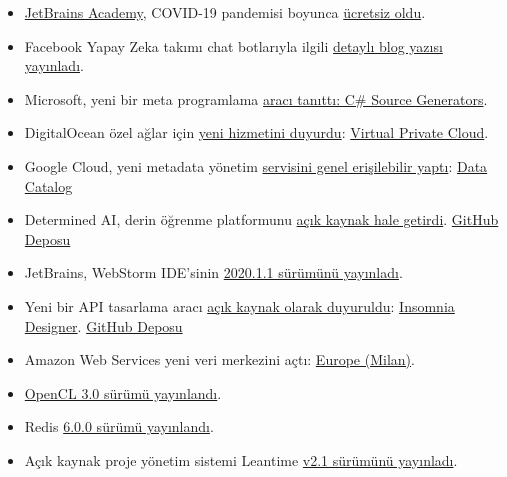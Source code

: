 \documentclass[11pt]{article}
\begin{document}
\begin{itemize}
\item \href{https://www.jetbrains.com/academy/}{JetBrains Academy}, COVID-19 pandemisi boyunca \href{https://techcrunch.com/2020/05/01/jetbrains-academy-for-learning-code-launches-for-free-during-covid-19-pandemic/}{ücretsiz oldu}.
\item Facebook Yapay Zeka takımı chat botlarıyla ilgili \href{https://ai.facebook.com/blog/state-of-the-art-open-source-chatbot}{detaylı blog yazısı
yayınladı}.
\item Microsoft, yeni bir meta programlama \href{https://devblogs.microsoft.com/dotnet/introducing-c-source-generators/}{aracı tanıttı: C\# Source Generators}.
\item DigitalOcean özel ağlar için \href{https://blog.digitalocean.com/vpc-trust-platform/}{yeni hizmetini duyurdu}: \href{https://www.digitalocean.com/products/vpc}{Virtual Private Cloud}.
\item Google Cloud, yeni metadata yönetim \href{https://cloud.google.com/blog/products/data-analytics/data-catalog-metadata-management-now-generally-available}{servisini genel erişilebilir yaptı}: \href{https://cloud.google.com/data-catalog}{Data
Catalog}
\item Determined AI, derin öğrenme platformunu \href{https://determined.ai/blog/ai-infrastructure-for-everyone/}{açık kaynak hale getirdi}. \href{https://github.com/determined-ai/determined/}{GitHub
Deposu}
\item JetBrains, WebStorm IDE'sinin \href{https://blog.jetbrains.com/webstorm/2020/04/webstorm-2020-1-1}{2020.1.1 sürümünü yayınladı}.
\item Yeni bir API tasarlama aracı \href{https://insomnia.rest/blog/introducing-designer}{açık kaynak olarak duyuruldu}: \href{https://insomnia.rest/products/designer/}{Insomnia
Designer}. \href{https://github.com/Kong/insomnia}{GitHub Deposu}
\item Amazon Web Services yeni veri merkezini açtı: \href{https://aws.amazon.com/about-aws/whats-new/2020/04/announcing-the-new-aws-europe-milan-region/}{Europe (Milan)}.
\item \href{https://www.khronos.org/news/press/khronos-group-releases-opencl-3.0}{OpenCL 3.0 sürümü yayınlandı}.
\item Redis \href{http://antirez.com/news/132}{6.0.0 sürümü yayınlandı}.
\item Açık kaynak proje yönetim sistemi Leantime \href{https://leantime.io/2020/04/29/leantime-v2-1-released-\%25F0\%259F\%259A\%2580\%25F0\%259F\%259A\%2580\%25F0\%259F\%259A\%2580/}{v2.1 sürümünü yayınladı}.

\end{itemize}
\end{document}
